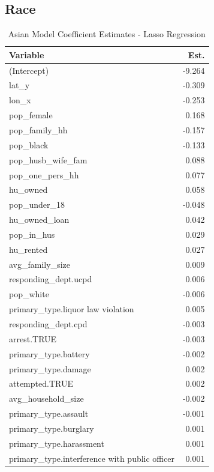 \documentclass{ucetd}
\begin{document}
\hypertarget{race}{%
\subsection{Race}\label{race}}

\begin{table}

\caption{\label{tab:asian-lasso}Asian Model Coefficient Estimates - Lasso Regression}
\centering
\begin{tabular}[t]{l|r}
\hline
Variable & Est.\\
\hline
(Intercept) & -9.264\\
\hline
lat\_y & -0.309\\
\hline
lon\_x & -0.253\\
\hline
pop\_female & 0.168\\
\hline
pop\_family\_hh & -0.157\\
\hline
pop\_black & -0.133\\
\hline
pop\_husb\_wife\_fam & 0.088\\
\hline
pop\_one\_pers\_hh & 0.077\\
\hline
hu\_owned & 0.058\\
\hline
pop\_under\_18 & -0.048\\
\hline
hu\_owned\_loan & 0.042\\
\hline
pop\_in\_hus & 0.029\\
\hline
hu\_rented & 0.027\\
\hline
avg\_family\_size & 0.009\\
\hline
responding\_dept.ucpd & 0.006\\
\hline
pop\_white & -0.006\\
\hline
primary\_type.liquor law violation & 0.005\\
\hline
responding\_dept.cpd & -0.003\\
\hline
arrest.TRUE & -0.003\\
\hline
primary\_type.battery & -0.002\\
\hline
primary\_type.damage & 0.002\\
\hline
attempted.TRUE & 0.002\\
\hline
avg\_household\_size & -0.002\\
\hline
primary\_type.assault & -0.001\\
\hline
primary\_type.burglary & 0.001\\
\hline
primary\_type.harassment & 0.001\\
\hline
primary\_type.interference with public officer & 0.001\\

\end{tabular}
\end{table}
\end{document}
